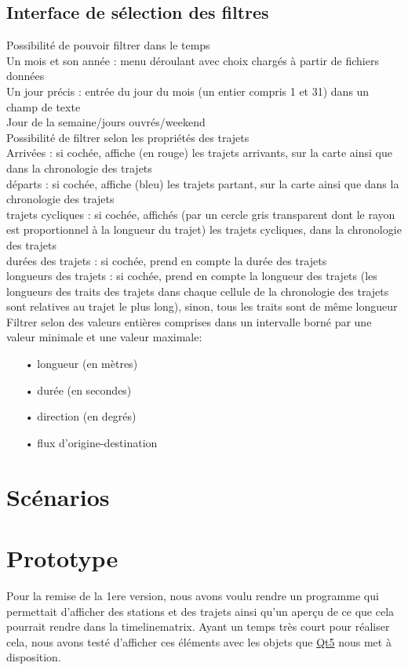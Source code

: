 \documentclass[12pt]{article}
\begin{document}
		\subsection{Interface de sélection des filtres}
		Possibilité de pouvoir filtrer dans le temps\\
		Un mois et son année : menu déroulant avec choix chargés à partir de fichiers
		données\\
		Un jour précis : entrée du jour du mois (un entier compris 1 et 31) dans un champ
		de texte\\
		Jour de la semaine/jours ouvrés/weekend\\
		Possibilité de filtrer selon les propriétés des trajets\\
		Arrivées : si cochée, affiche (en rouge) les trajets arrivants, sur la carte ainsi
		que dans la chronologie des trajets\\
		départs : si cochée, affiche (bleu) les trajets partant, sur la carte ainsi que
		dans la chronologie des trajets\\
		trajets cycliques : si cochée, affichés (par un cercle gris transparent dont le
		rayon est proportionnel à la longueur du trajet) les trajets cycliques, dans la
		chronologie des trajets\\
		durées des trajets : si cochée, prend en compte la durée des trajets\\
		longueurs des trajets : si cochée, prend en compte la longueur des trajets
		(les longueurs des traits des trajets dans chaque cellule de la chronologie des
		trajets sont relatives au trajet le plus long), sinon, tous les traits sont
		de même longueur\\
		
		Filtrer selon des valeurs entières comprises dans un intervalle borné par une
		valeur minimale et une valeur maximale:
		\begin{itemize}
			\item[•]longueur (en mètres)
			\item[•]durée (en secondes)
			\item[•]direction (en degrés)
			\item[•]flux d’origine-destination
		\end{itemize}
	
	\newpage
	\section{Scénarios}
	
	\newpage
	\section{Prototype}
	Pour la remise de la 1ere version, nous avons voulu rendre un programme qui permettait
	d'afficher des stations et des trajets ainsi qu'un aperçu de ce que cela pourrait rendre
	dans la timelinematrix. Ayant un temps très court pour réaliser cela, nous avons testé
	d'afficher ces éléments avec les objets que \href{https://www.qt.io/}{Qt5}
	nous met à disposition.\\
	
\end{document}
